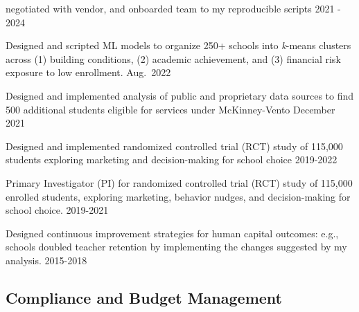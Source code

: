 \documentclass[
  11pt,
]
{article}
\renewenvironment{itemize}{
  \begin{list}{}{
    \setlength{\leftmargin}{1.5em}
  }
}{
  \end{list}
}
\begin{document}
\begin{itemize}
  negotiated with vendor, and onboarded team to my reproducible scripts
  \hfill 2021 - 2024
\item
  Designed and scripted ML models to organize 250+ schools into
  \emph{k}-means clusters across (1) building conditions, (2) academic
  achievement, and (3) financial risk exposure to low enrollment.
  \hfill Aug.~2022
\item
  Designed and implemented analysis of public and proprietary data
  sources to find 500 additional students eligible for services under
  McKinney-Vento \hfill December 2021
\item
  Designed and implemented randomized controlled trial (RCT) study of
  115,000 students exploring marketing and decision-making for school
  choice \hfill 2019-2022
\item
  Primary Investigator (PI) for randomized controlled trial (RCT) study
  of 115,000 enrolled students, exploring marketing, behavior nudges,
  and decision-making for school choice. \hfill 2019-2021
\item
  Designed continuous improvement strategies for human capital outcomes:
  e.g., schools doubled teacher retention by implementing the changes
  suggested by my analysis. \hfill 2015-2018
\end{itemize}

\subsection{\texorpdfstring{\textbf{Compliance and Budget Management
}}{Compliance and Budget Management }}\label{compliance-and-budget-management}
\end{document}
